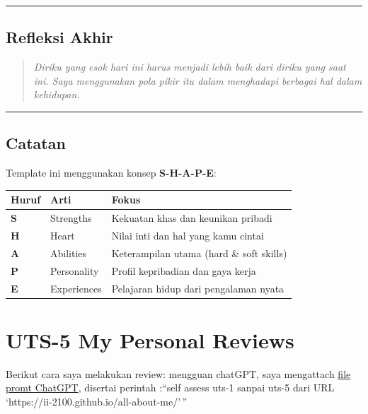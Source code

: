 \documentclass[
  letterpaper,
  DIV=11,
  numbers=noendperiod]{scrreprt}
\begin{document}
\begin{center}\rule{0.5\linewidth}{0.5pt}\end{center}

\section{Refleksi Akhir}\label{refleksi-akhir}

\begin{quote}
\emph{Diriku yang esok hari ini harus menjadi lebih baik dari diriku
yang saat ini. Saya menggunakan pola pikir itu dalam menghadapi berbagai
hal dalam kehidupan.}
\end{quote}

\begin{center}\rule{0.5\linewidth}{0.5pt}\end{center}

\section{Catatan}\label{catatan}

Template ini menggunakan konsep \textbf{S-H-A-P-E}:

\begin{longtable}[]{@{}lll@{}}
\toprule\noalign{}
Huruf & Arti & Fokus \\
\midrule\noalign{}
\endhead
\bottomrule\noalign{}
\endlastfoot
\textbf{S} & Strengths & Kekuatan khas dan keunikan pribadi \\
\textbf{H} & Heart & Nilai inti dan hal yang kamu cintai \\
\textbf{A} & Abilities & Keterampilan utama (hard \& soft skills) \\
\textbf{P} & Personality & Profil kepribadian dan gaya kerja \\
\textbf{E} & Experiences & Pelajaran hidup dari pengalaman nyata \\
\end{longtable}


\chapter{UTS-5 My Personal Reviews}\label{uts-5-my-personal-reviews}

Berikut cara saya melakukan review: mengguan chatGPT, saya mengattach
\href{skor_uts.pdf}{file promt ChatGPT}, disertai perintah :``self
assess uts-1 sanpai uts-5 dari URL
`https://ii-2100.github.io/all-about-me/'\,''
\end{document}
